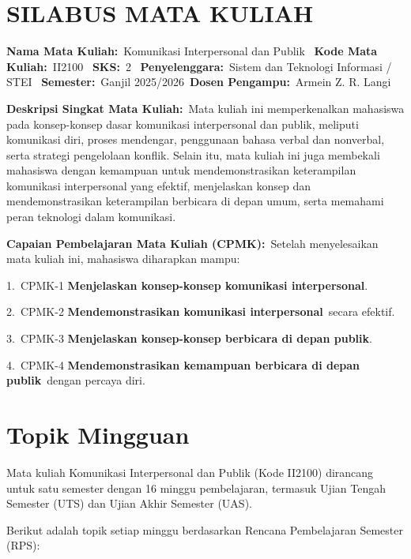 \documentclass[
  letterpaper,
  DIV=11,
  numbers=noendperiod]{scrreprt}
\begin{document}
\section*{\texorpdfstring{\textbf{SILABUS MATA
KULIAH}}{SILABUS MATA KULIAH}}\label{silabus-mata-kuliah}


\textbf{Nama Mata Kuliah:}~Komunikasi Interpersonal dan Publik~
\textbf{Kode Mata Kuliah:}~II2100~ \textbf{SKS:}~2~
\textbf{Penyelenggara:}~Sistem dan Teknologi Informasi / STEI~
\textbf{Semester:}~Ganjil 2025/2026~\textbf{Dosen Pengampu:}~Armein Z.
R. Langi

\textbf{Deskripsi Singkat Mata Kuliah:}~Mata kuliah ini memperkenalkan
mahasiswa pada konsep-konsep dasar komunikasi interpersonal dan publik,
meliputi komunikasi diri, proses mendengar, penggunaan bahasa verbal dan
nonverbal, serta strategi pengelolaan konflik. Selain itu, mata kuliah
ini juga membekali mahasiswa dengan kemampuan untuk mendemonstrasikan
keterampilan komunikasi interpersonal yang efektif, menjelaskan konsep
dan mendemonstrasikan keterampilan berbicara di depan umum, serta
memahami peran teknologi dalam komunikasi.

\textbf{Capaian Pembelajaran Mata Kuliah (CPMK):}~Setelah menyelesaikan
mata kuliah ini, mahasiswa diharapkan mampu:

1.~CPMK-1 \textbf{Menjelaskan konsep-konsep komunikasi interpersonal}.

2.~CPMK-2 \textbf{Mendemonstrasikan komunikasi interpersonal}~secara
efektif.

3.~CPMK-3 \textbf{Menjelaskan konsep-konsep berbicara di depan publik}.

4.~CPMK-4 \textbf{Mendemonstrasikan kemampuan berbicara di depan
publik}~dengan percaya diri.

\section*{Topik Mingguan}\label{topik-mingguan}


Mata kuliah Komunikasi Interpersonal dan Publik (Kode II2100) dirancang
untuk satu semester dengan 16 minggu pembelajaran, termasuk Ujian Tengah
Semester (UTS) dan Ujian Akhir Semester (UAS).

Berikut adalah topik setiap minggu berdasarkan Rencana Pembelajaran
Semester (RPS):
\end{document}
